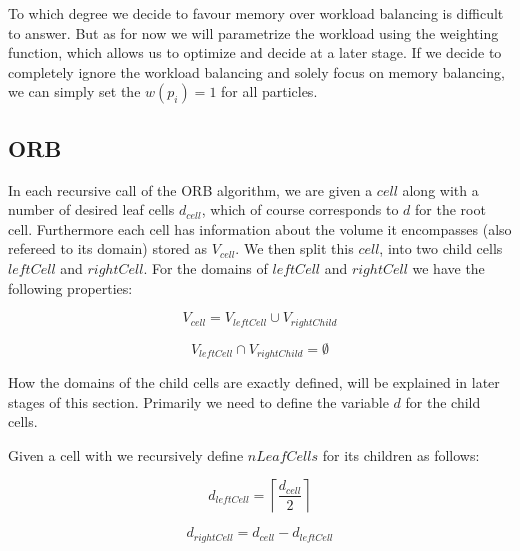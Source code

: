\documentclass[]{article}
\begin{document}
To which degree we decide to favour memory over workload balancing is difficult to answer. But as for now we will parametrize the workload using the weighting function, which allows us to optimize and decide at a later stage. If we decide to completely ignore the workload balancing and solely focus on memory balancing, we can simply set the $w(p_i) = 1$ for all particles.


\subsection{ORB}


In each recursive call of the ORB algorithm, we are given a $cell$ along with a number of desired leaf cells $d_{cell}$, which of course corresponds to $d$ for the root cell. Furthermore each cell has information about the volume it encompasses (also refereed to its domain) stored as $V_{cell}$. We then split this $cell$, into two child cells $leftCell$ and $rightCell$. For the domains of $leftCell$ and $rightCell$ we have the following properties: 

\begin{center}
	\begin{equation}
		V_{cell} = V_{leftCell} \cup V_{rightChild}
	\end{equation}
\end{center}

\begin{center}
	\begin{equation}
		V_{leftCell} \cap V_{rightChild} = \emptyset
	\end{equation}
\end{center}

How the domains of the child cells are exactly defined, will be explained in later stages of this section. Primarily we need to define the variable $d$ for the child cells.

Given a cell with we recursively define $nLeafCells$ for its children as follows:

\begin{center}
	\begin{equation}
		d_{leftCell} = \left \lceil\frac{d_{cell}}{2} \right \rceil 
	\end{equation}
\end{center}

\begin{center}
	\begin{equation}
		d_{rightCell} = d_{cell} - d_{leftCell}
	\end{equation}
\end{center}
\end{document}
